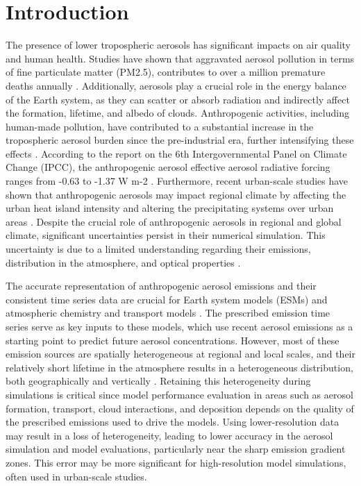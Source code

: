 \section{Introduction}

The presence of lower tropospheric aerosols has significant impacts on air quality and human health. Studies have shown that aggravated aerosol pollution in terms of fine particulate matter (PM2.5), contributes to over a million premature deaths annually \citep{lelieveld2015contribution,davidson2005airborne}. Additionally, aerosols play a crucial role in the energy balance of the Earth system, as they can scatter or absorb radiation and indirectly affect the formation, lifetime, and albedo of clouds. Anthropogenic activities, including human-made pollution, have contributed to a substantial increase in the tropospheric aerosol burden since the pre-industrial era, further intensifying these effects \citep{Bond07}. According to the report on the 6th Intergovernmental Panel on Climate Change (IPCC), the anthropogenic aerosol effective aerosol radiative forcing ranges from -0.63 to -1.37 W m-2 \citep{smith2020effective}. Furthermore, recent urban-scale studies have shown that anthropogenic aerosols may impact regional climate by affecting the urban heat island intensity \citep{han2020mechanisms,yang2020pm2,wu2017urban} and altering the precipitating systems over urban areas \citep{rosenfeld2008flood,van2007urban}. Despite the crucial role of anthropogenic aerosols in regional and global climate, significant uncertainties persist in their numerical simulation. This uncertainty is due to a limited understanding regarding their emissions, distribution in the atmosphere, and optical properties \citep{kinne2006aerocom,schulz2006radiative,textor2006analysis,myhre2013radiative,samset2013black}.

The accurate representation of anthropogenic aerosol emissions and their consistent time series data are crucial for Earth system models (ESMs) and atmospheric chemistry and transport models \citep{hoesly2018historical}. The prescribed emission time series serve as key inputs to these models, which use recent aerosol emissions as a starting point to predict future aerosol concentrations. However, most of these emission sources are spatially heterogeneous at regional and local scales, and their relatively short lifetime in the atmosphere results in a heterogeneous distribution, both geographically and vertically \citep{koch2009evaluation}. Retaining this heterogeneity during simulations is critical since model performance evaluation in areas such as aerosol formation, transport, cloud interactions, and deposition depends on the quality of the prescribed emissions used to drive the models. Using lower-resolution data may result in a loss of heterogeneity, leading to lower accuracy in the aerosol simulation and model evaluations, particularly near the sharp emission gradient zones. This error may be more significant for high-resolution model simulations, often used in urban-scale studies.

